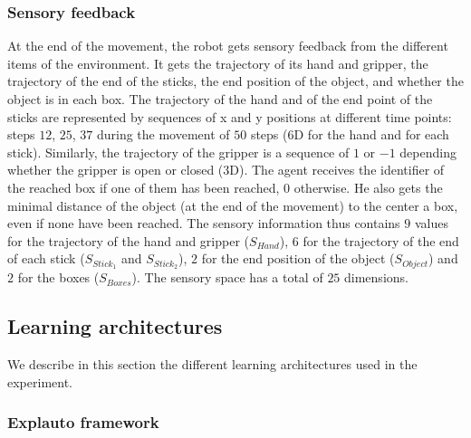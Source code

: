 \documentclass[10pt,letterpaper]{article}
\begin{document}
		
		\subsubsection{Sensory feedback}
		
			At the end of the movement, the robot gets sensory feedback from the different items of the environment.
			It gets the trajectory of its hand and gripper, the trajectory of the end of the sticks, 
			the end position of the object, and whether the object is in each box.		
			The trajectory of the hand and of the end point of the sticks are represented by sequences of x and y positions at different time points: 
			steps $12$, $25$, $37$ during the movement of $50$ steps ($6$D for the hand and for each stick).
			Similarly, the trajectory of the gripper is a sequence of $1$ or $-1$ depending whether the gripper is open or closed ($3$D).
			The agent receives the identifier of the reached box if one of them has been reached, 0 otherwise. He also gets the minimal distance of the object (at the end of the movement) to the center a box, even if none have been reached.
			The sensory information thus contains $9$ values for the trajectory of the hand and gripper ($S_{Hand}$), $6$ for the trajectory of the end of each stick ($S_{Stick_1}$ and $S_{Stick_2}$), $2$ for the end position of the object ($S_{Object}$) and $2$ for the boxes ($S_{Boxes}$).
			The sensory space has a total of $25$ dimensions.
			
		
	
	\subsection{Learning architectures}

		We describe in this section the different learning architectures used in the experiment. 
		
		\subsubsection{Explauto framework}
			
\end{document}
